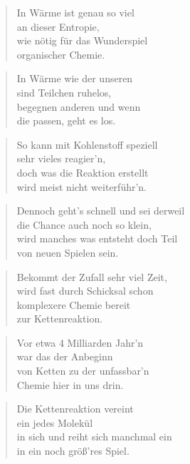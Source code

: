 \documentclass[10pt,a4paper]{article}
\begin{document}
\begin{multicols}{2}
\begin{verse}
In Wärme ist genau so viel \\
an dieser Entropie, \\
wie nötig für das Wunderspiel \\
organischer Chemie. \\
\end{verse}

\begin{verse}
In Wärme wie der unseren \\
sind Teilchen ruhelos, \\
begegnen anderen und wenn \\
die passen, geht es los. \\
\end{verse}

\begin{verse}
So kann mit Kohlenstoff speziell \\
sehr vieles reagier’n, \\
doch was die Reaktion erstellt \\
wird meist nicht weiterführ’n. \\
\end{verse}

\begin{verse}
Dennoch geht’s schnell und sei derweil \\
die Chance auch noch so klein, \\
wird manches was entsteht doch Teil \\
von neuen Spielen sein. \\
\end{verse}

\begin{verse}
Bekommt der Zufall sehr viel Zeit, \\
wird fast durch Schicksal schon \\
komplexere Chemie bereit \\
zur Kettenreaktion. \\
\end{verse}

\begin{verse}
Vor etwa 4 Milliarden Jahr’n \\
war das der Anbeginn \\
von Ketten zu der unfassbar’n \\
Chemie hier in uns drin. \\
\end{verse}

\begin{verse}
Die Kettenreaktion vereint \\
ein jedes Molekül \\
in sich und reiht sich manchmal ein \\
in ein noch größ’res Spiel. \\
\end{verse}


\end{multicols}
\end{document}
